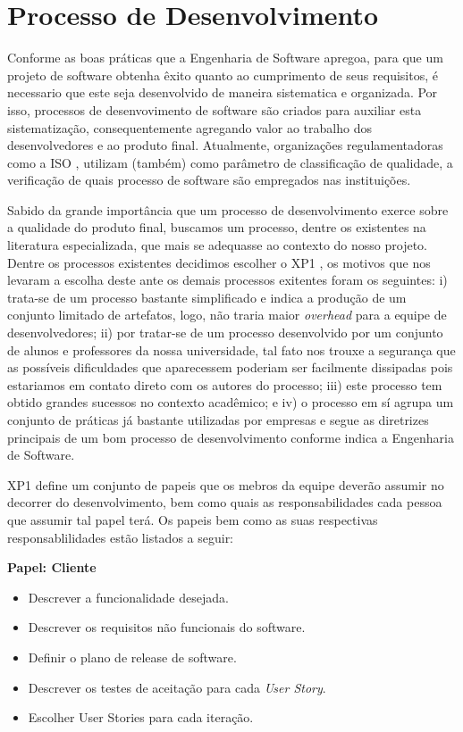 \chapter{Processo de Desenvolvimento}

Conforme as boas práticas que a Engenharia de Software apregoa, para que um projeto de software obtenha êxito quanto ao cumprimento de seus requisitos, é necessario que este seja desenvolvido de maneira sistematica e organizada. Por isso, processos de desenvovimento de software são criados para auxiliar esta sistematização, consequentemente agregando valor ao trabalho dos desenvolvedores e ao produto final. Atualmente, organizações regulamentadoras como a ISO \cite{iso}, utilizam (também) como parâmetro de classificação de qualidade, a verificação de quais processo de software são empregados nas instituições.

Sabido da grande importância que um processo de desenvolvimento exerce sobre a qualidade do produto final, buscamos um processo, dentre os existentes na literatura especializada, que mais se adequasse ao contexto do nosso projeto. Dentre os processos existentes decidimos escolher o XP1 \cite{xp1}, os motivos que nos levaram a escolha deste ante os demais processos exitentes foram os seguintes: i) trata-se de um processo bastante simplificado e indica a produção de um conjunto limitado de artefatos, logo, não traria maior \textit{overhead} para a equipe de desenvolvedores; ii) por tratar-se de um processo desenvolvido por um conjunto de alunos e professores da nossa universidade, tal fato nos trouxe a segurança que as possíveis dificuldades que aparecessem poderiam ser facilmente dissipadas pois estariamos em contato direto com os autores do processo; iii) este processo tem obtido grandes sucessos no contexto acadêmico; e iv) o processo em sí agrupa um conjunto de práticas já bastante utilizadas por empresas e segue as diretrizes principais de um bom processo de desenvolvimento conforme indica a Engenharia de Software.

XP1 define um conjunto de papeis que os mebros da equipe deverão assumir no decorrer do desenvolvimento, bem como quais as responsabilidades  cada pessoa que assumir tal papel terá. Os papeis bem como as suas respectivas responsablilidades estão listados a seguir:

\textbf{Papel: Cliente}
\begin{itemize}
 \item Descrever a funcionalidade desejada.
 \item Descrever os requisitos não funcionais do software.
 \item Definir o plano de release de software.
 \item Descrever os testes de aceitação para cada \textit{User Story}.
 \item Escolher User Stories para cada iteração.
\end{itemize}


